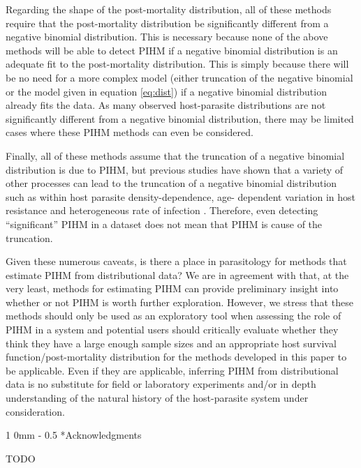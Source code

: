 \documentclass[12pt, a4paper]{article}
\makeatletter
\renewcommand{\section}{\@startsection
{section}%
{1}%
{0mm}%
{-\baselineskip}%
{0.5\baselineskip}%
{\normalfont\bf\large}} %
\makeatother
\begin{document}
Regarding the shape of the post-mortality distribution, all of these methods
require that the post-mortality distribution be significantly different from a
negative binomial distribution.  This is necessary because none of the above
methods will be able to detect PIHM if a negative binomial distribution is an
adequate fit to the post-mortality distribution.  This is simply because there will be no need for a more complex model (either truncation of the negative binomial or the model given in equation \ref{eq:dist}) if a negative binomial distribution already fits the data. As many
observed host-parasite distributions are not significantly different from a
negative binomial distribution, there may be limited cases where these PIHM methods
can even be considered.

Finally, all of these methods assume that the truncation of a negative binomial
distribution is due to PIHM, but previous studies have shown that a variety of other processes can lead to the truncation of a negative
binomial distribution such as within host parasite density-dependence, age-
dependent variation in host resistance and heterogeneous rate of infection
\citep{McCallum2000a,Anderson1982a,Rousset1996}.  Therefore, even detecting ``significant'' PIHM in a
dataset does not mean that PIHM is cause of the truncation.

Given these numerous caveats, is there a place in parasitology for methods that
estimate PIHM from distributional data?  We are in agreement with
\cite{Lester1984} that, at the very least, methods for estimating PIHM can
provide preliminary insight into whether or not PIHM is worth further
exploration.  However, we stress that these methods should only be used as an
exploratory tool when assessing the role of PIHM in a system and potential
users should critically evaluate whether they think they have a large enough
sample sizes and an appropriate host survival function/post-mortality distribution for the methods developed
in this paper to be applicable.  Even if they are applicable, inferring PIHM
from distributional data is no substitute for field or laboratory experiments
and/or in depth understanding of the natural history of the host-parasite
system under consideration.

\section*{Acknowledgments}

TODO

\singlespacing


\end{document}
